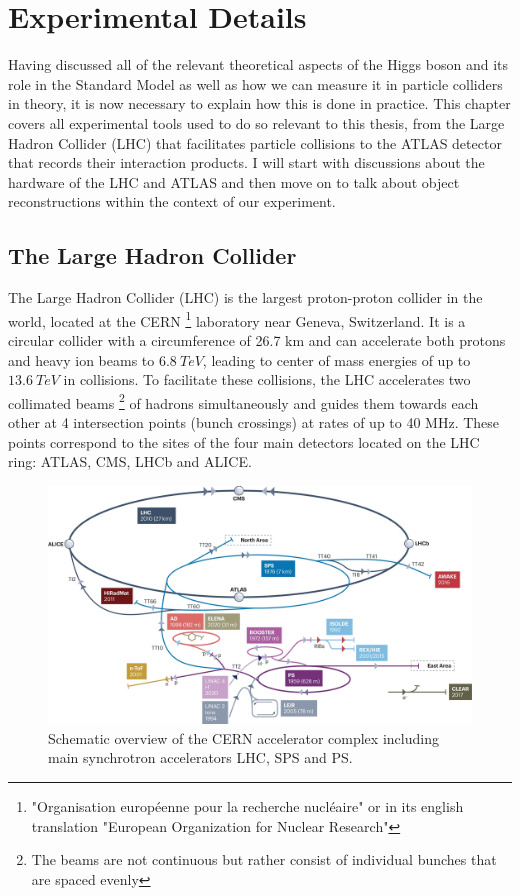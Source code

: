 \chapter{Experimental Details}

Having discussed all of the relevant theoretical aspects of the Higgs boson and its role in the Standard Model as 
well as how we can measure it in particle colliders in theory, it is now necessary to explain how this is done in 
practice. This chapter covers all experimental tools used to do so relevant to this thesis, from the Large Hadron 
Collider (LHC) that facilitates particle collisions to the ATLAS detector that records their interaction products. 
I will start with discussions about the hardware of the LHC and ATLAS and then move on to talk about object 
reconstructions within the context of our experiment.

\section{The Large Hadron Collider}

The Large Hadron Collider (LHC) is the largest proton-proton collider in the world, located at the CERN
\footnote{"Organisation européenne pour la recherche nucléaire" or in its english translation "European 
Organization for Nuclear Research"} laboratory near Geneva, Switzerland. It is a circular collider with a circumference 
of 26.7 km and can accelerate both protons and heavy ion beams to $6.8\ TeV$, leading to center of mass energies of up 
to $13.6\ TeV$ in collisions. To facilitate these collisions, the LHC accelerates two collimated beams \footnote{The 
beams are not continuous but rather consist of individual bunches that are spaced evenly} of hadrons simultaneously and 
guides them towards each other at 4 intersection points (bunch crossings) at rates of up to 40 MHz. These points 
correspond to the sites of the four main detectors located on the LHC ring: ATLAS, CMS, LHCb and ALICE. \par

\begin{figure}
\centering
    \includegraphics[width=1.0\textwidth]{images/CERN_Complex.png}
    \caption{Schematic overview of the CERN accelerator complex including main synchrotron accelerators LHC, SPS 
    and PS.}
    \label{fig:CERN_Complex}
\end{figure}


